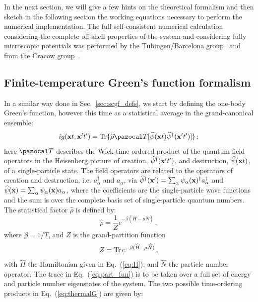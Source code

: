 In the next section, we will give a few hints on the theoretical formalism and then sketch in the following section the working equations necessary to perform the numerical implementation. The full self-consistent numerical calculation considering the complete off-shell properties of the system and considering fully microscopic potentials was performed by the T\"ubingen/Barcelona group~\cite{ch11_Frick2003,ch11_Frick2004PhD,ch11_Frick2005,ch11_Rios2006C74,ch11_Rios2008,ch11_Rios2009} and from the Cracow group~\cite{ch11_Soma2006,ch11_Soma2008,ch11_Soma2009,ch11_Soma2009phd}.

\subsection{Finite-temperature Green's function formalism}
In a similar way done in Sec.~\ref{sec:scgf_defs}, we start by defining the one-body Green's function, however this time as a statistical average in the grand-canonical ensemble:
\begin{equation}
\label{eq:thermalG}
ig({\bf x}t, {\bf x'}t')= {\rm Tr}\{\widehat{\rho}{\pazocal T}[\widehat\psi({\bf x}t) \widehat\psi^\dagger({\bf x'}t')]\}\,;
\end{equation}
here ${\pazocal T}$ describes the Wick time-ordered product of the quantum field operators in the Heisenberg picture of creation, $\widehat\psi^\dagger({\bf x'}t')$, and destruction, $\widehat\psi({\bf x}t)$, of a single-particle state. The field operators are related to the operators of creation and destruction, i.e. $a^\dagger_\alpha$ and $a_\alpha$, via $\widehat\psi^\dagger({\bf x'})=\sum_\alpha\psi_\alpha({\bf x})^\dagger a^\dagger_\alpha$ and $\widehat\psi({\bf x})=\sum_\alpha\psi_\alpha({\bf x}) a_\alpha$, where the coefficients are the single-particle wave functions and the sum is over the complete basis set of single-particle quantum numbers. The statistical factor $\widehat \rho$ is defined by:
\begin{equation}
\widehat \rho=\frac{1}{Z}e^{-\beta(\widehat H -\mu\widehat N)}\,,
\end{equation}
where $\beta=1/T$, and $Z$ is the grand-partition function
\begin{equation}
\label{eq:part_fun}
Z={\rm Tr}\,e^{-\beta(\widehat H -\mu\widehat N)}\,,
\end{equation}
with $\widehat H$ the Hamiltonian given in Eq.~(\ref{eq:H}), and $\widehat N$ the particle number operator. The trace in Eq.~(\ref{eq:part_fun}) is to be taken over a full set of energy and particle number eigenstates of the system. The two possible time-ordering products in Eq.~(\ref{eq:thermalG}) are given by:

